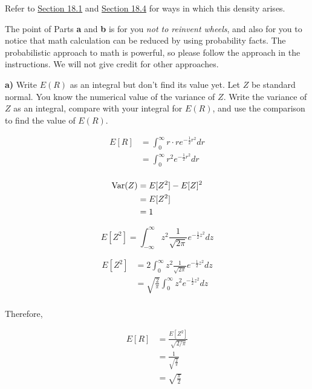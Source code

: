 \documentclass[11pt]{article}
\begin{document}
Refer to
\href{https://data140.org/textbook/content/chapter-18/standard-normal-basics/\#variance}{Section
18.1} and
\href{https://data140.org/textbook/content/chapter-18/chi-squared-distributions/\#from-chi-squared-1-to-chi-squared-n}{Section
18.4} for ways in which this density arises.

The point of Parts \textbf{a} and \textbf{b} is for you \emph{not to
reinvent wheels}, and also for you to notice that math calculation can
be reduced by using probability facts. The probabilistic approach to
math is powerful, so please follow the approach in the instructions. We
will not give credit for other approaches.

\textbf{a)} Write \(E(R)\) as an integral but don't find its value yet.
Let \(Z\) be standard normal. You know the numerical value of the
variance of \(Z\). Write the variance of \(Z\) as an integral, compare
with your integral for \(E(R)\), and use the comparison to find the
value of \(E(R)\).

\begin{align*}
	E[R] &= \int_{0}^{\infty } r \cdot re^{-\frac{1}{2}r^{2}} dr \\
	&= \int_{0}^{\infty }r^{2} e^{-\frac{1}{2}r^{2}}dr \\
\end{align*}


\begin{align*}
\operatorname{Var}(Z) &= E[Z^{2}] - E[Z]^{2} \\
&= E[Z^{2}] \\
&= 1 \\
\end{align*}


\[
	E[Z^{2}] = \int_{-\infty}^{\infty} z^{2} \frac{1}{\sqrt{2\pi}} e^{-\frac{1}{2}z^{2}}dz
\]

\begin{align*}
	E[Z^{2}] &= 2 \int_{0}^{\infty } z^{2} \frac{1}{\sqrt{2\pi}} e^{-\frac{1}{2}z^{2}}dz \\
		 &= \sqrt{\frac{2}{\pi}} \int_{0}^{\infty } z^{2} e^{-\frac{1}{2}z^{2}}dz \\
\end{align*}

Therefore, 

\begin{align*}
	E[R] &= \frac{E[Z^{2}]}{\sqrt{2 / \pi}} \\
	     &= \frac{1}{\sqrt{\frac{2}{\pi}}} \\
	     &= \sqrt{\frac{\pi}{2}} \\
\end{align*}
\end{document}

